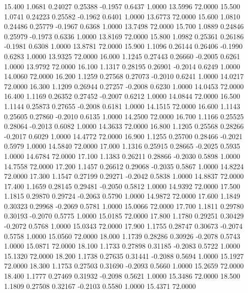   15.400   1.0681   0.24027   0.25388  -0.1957   0.6437   1.0000  13.5996  72.0000
  15.500   1.0741   0.24223   0.25582  -0.1962   0.6401   1.0000  13.6773  72.0000
  15.600   1.0810   0.24486   0.25779  -0.1967   0.6368   1.0000  13.7498  72.0000
  15.700   1.0889   0.24846   0.25979  -0.1973   0.6336   1.0000  13.8169  72.0000
  15.800   1.0982   0.25361   0.26186  -0.1981   0.6308   1.0000  13.8781  72.0000
  15.900   1.1096   0.26144   0.26406  -0.1990   0.6283   1.0000  13.9325  72.0000
  16.000   1.1245   0.27443   0.26660  -0.2005   0.6261   1.0000  13.9792  72.0000
  16.100   1.1317   0.28195   0.26901  -0.2014   0.6249   1.0000  14.0060  72.0000
  16.200   1.1259   0.27568   0.27073  -0.2010   0.6241   1.0000  14.0217  72.0000
  16.300   1.1209   0.26944   0.27257  -0.2008   0.6230   1.0000  14.0453  72.0000
  16.400   1.1169   0.26352   0.27452  -0.2007   0.6212   1.0000  14.0844  72.0000
  16.500   1.1144   0.25873   0.27655  -0.2008   0.6181   1.0000  14.1515  72.0000
  16.600   1.1143   0.25605   0.27860  -0.2010   0.6135   1.0000  14.2500  72.0000
  16.700   1.1166   0.25525   0.28064  -0.2013   0.6082   1.0000  14.3633  72.0000
  16.800   1.1205   0.25568   0.28266  -0.2017   0.6029   1.0000  14.4772  72.0000
  16.900   1.1255   0.25700   0.28466  -0.2021   0.5979   1.0000  14.5840  72.0000
  17.000   1.1316   0.25915   0.28665  -0.2025   0.5935   1.0000  14.6784  72.0000
  17.100   1.1383   0.26211   0.28866  -0.2030   0.5898   1.0000  14.7558  72.0000
  17.200   1.1457   0.26612   0.29068  -0.2035   0.5867   1.0000  14.8224  72.0000
  17.300   1.1547   0.27199   0.29271  -0.2042   0.5838   1.0000  14.8837  72.0000
  17.400   1.1659   0.28145   0.29481  -0.2050   0.5812   1.0000  14.9392  72.0000
  17.500   1.1815   0.29870   0.29724  -0.2063   0.5790   1.0000  14.9872  72.0000
  17.600   1.1849   0.30323   0.29968  -0.2069   0.5781   1.0000  15.0066  72.0000
  17.700   1.1811   0.29780   0.30193  -0.2070   0.5775   1.0000  15.0185  72.0000
  17.800   1.1780   0.29251   0.30429  -0.2072   0.5768   1.0000  15.0343  72.0000
  17.900   1.1755   0.28747   0.30673  -0.2074   0.5758   1.0000  15.0560  72.0000
  18.000   1.1739   0.28286   0.30926  -0.2078   0.5743   1.0000  15.0871  72.0000
  18.100   1.1733   0.27898   0.31185  -0.2083   0.5722   1.0000  15.1320  72.0000
  18.200   1.1738   0.27635   0.31441  -0.2088   0.5694   1.0000  15.1927  72.0000
  18.300   1.1753   0.27503   0.31690  -0.2093   0.5660   1.0000  15.2659  72.0000
  18.400   1.1777   0.27469   0.31932  -0.2098   0.5621   1.0000  15.3486  72.0000
  18.500   1.1809   0.27508   0.32167  -0.2103   0.5580   1.0000  15.4371  72.0000

